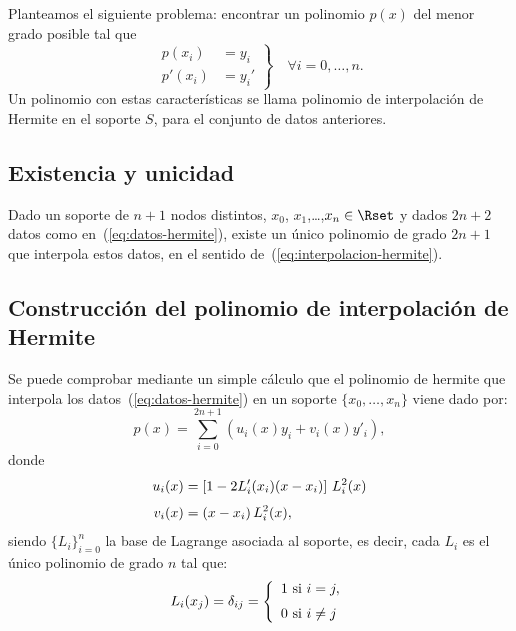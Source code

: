 Planteamos el siguiente problema: encontrar un polinomio $p(x)$ del
menor grado posible tal que
\begin{equation}
  \left.
    \begin{aligned}
      p(x_i) &= y_i \\ p'(x_i)&=y_i'
    \end{aligned}
  \right\}\quad \forall i=0,\dots,n.
  \label{eq:interpolacion-hermite}
\end{equation}
Un polinomio con estas características se llama polinomio de
interpolación de Hermite en el soporte $S$, para el conjunto de
datos anteriores.

\subsection{Existencia y unicidad}
\label{sec:exist-y-unic}

\begin{theorem}
  Dado un soporte de $n+1$ nodos distintos, $x_0$,
  $x_1$,\dots,$x_n\in\Rset$ y dados $2n+2$ datos como
  en~(\ref{eq:datos-hermite}), existe un único polinomio de grado
  $2n+1$ que interpola estos datos, en el sentido
  de~(\ref{eq:interpolacion-hermite}).
\end{theorem}

\subsection*{Construcción del polinomio de interpolación de Hermite}
\label{sec:constr-del-polin-hermite}

Se puede comprobar mediante un simple cálculo que el polinomio de
hermite que interpola los datos~(\ref{eq:datos-hermite}) en un soporte
$\{x_0,\dots,x_n\}$ viene dado por:
\begin{equation}
  \label{eq:formula-hermite-lagrange}
  p(x)=\sum_{i=0}^{2n+1}(u_i(x)y_i+ v_i(x)y'_i),
\end{equation}
donde
\begin{align*}
  u_i(x)&=\left[1-2L'_i(x_i)(x-x_i)\right]\, L_i^2(x)
  \\ \noalign{\smallskip}
  v_i(x)&=(x-x_i)\, L_i^2(x),
\end{align*}
siendo $\{L_i\}_{i=0}^n$ la base de Lagrange asociada al soporte,
es decir, cada $L_i$ es el único polinomio de grado $n$ tal que:
\begin{equation}
  L_i(x_j)= \delta_{ij} =
  \left\{\begin{array}{l}
           1 \text{ si } i=j, \\\noalign{\medskip} 0 \text{ si } i\neq j
         \end{array}\right.
     \end{equation}

